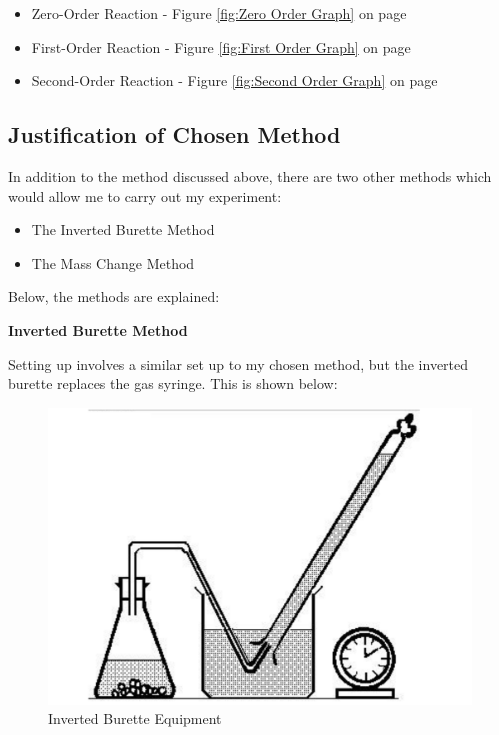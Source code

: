 \begin{itemize}
\item Zero-Order Reaction -  Figure \ref{fig:Zero Order Graph} on page \pageref{fig:Zero Order Graph}
\item First-Order Reaction -  Figure \ref{fig:First Order Graph} on page \pageref{fig:First Order Graph}
\item Second-Order Reaction -  Figure \ref{fig:Second Order Graph} on page \pageref{fig:Second Order Graph}
\end{itemize}


	\subsection{Justification of Chosen Method}

In addition to the method discussed above, there are two other methods which would allow me to carry out my experiment:
\begin{itemize}
\item The Inverted Burette Method
\item The Mass Change Method 
\end{itemize}

Below, the methods are explained:

\textbf{Inverted Burette Method}



Setting up involves a similar set up to my chosen method, but the inverted burette replaces the gas syringe. This is shown below:

\begin{figure}[H]
    \includegraphics[width=\textwidth]{./Planning/Images/InvertedBurette.pdf}
    \caption{Inverted Burette Equipment} \label{fig:Inverted Burette}
\end{figure}


